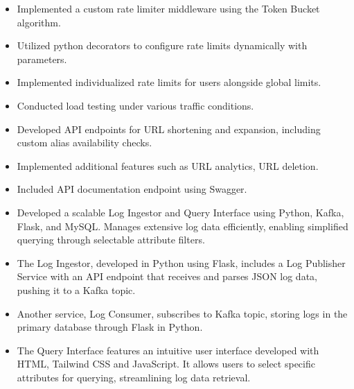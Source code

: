 \smallskip
{}


\smallskip
{}
\smallskip
\begin{itemize}
\item Implemented a custom rate limiter middleware using the Token Bucket algorithm.
\item Utilized python decorators to configure rate limits dynamically with parameters.
\item Implemented individualized rate limits for users alongside global limits.
\item Conducted load testing under various traffic conditions.
\end{itemize}
\smallskip
{}
\smallskip
\begin{itemize}
\item Developed API endpoints for URL shortening and expansion, including custom alias availability checks.
\item Implemented additional features such as URL analytics, URL deletion.
\item Included API documentation endpoint using Swagger.
\end{itemize}
\smallskip
{}
\smallskip
\begin{itemize}
\item Developed a scalable Log Ingestor and Query Interface using Python, Kafka, Flask, and MySQL. Manages extensive log data efficiently, enabling simplified querying through selectable attribute filters.
\item The Log Ingestor, developed in Python using Flask, includes a Log Publisher Service with an API endpoint that receives and parses JSON log data, pushing it to a Kafka topic.
\item  Another service, Log Consumer, subscribes to Kafka topic, storing logs in the primary database through Flask in Python.
\item The Query Interface features an intuitive user interface developed with HTML, Tailwind CSS and JavaScript. It allows users to select specific attributes for querying, streamlining log data retrieval.
\end{itemize}
\cvproject{}


